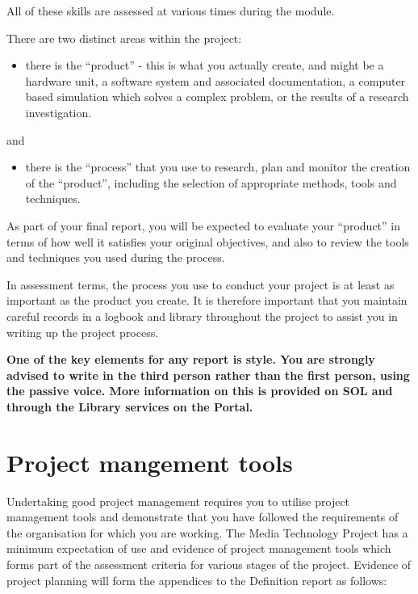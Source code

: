 All of these skills are assessed at various times during the module.

There are two distinct areas within the project:

\begin{itemize}
    \item there is the “product” - this is what you actually create, and might be a hardware unit, a
    software system and associated documentation, a computer based simulation which
    solves a complex problem, or the results of a research investigation.
\end{itemize}

and

\begin{itemize}
    \item there is the “process” that you use to research, plan and monitor the creation of the
    “product”, including the selection of appropriate methods, tools and techniques.
\end{itemize}

As part of your final report, you will be expected to evaluate your “product” in terms of how well it satisfies your original objectives, and also to review the tools and techniques you used during the process.

In assessment terms, the process you use to conduct your project is at least as important as the product you create. It is therefore important that you maintain careful records in a logbook and library throughout the project to assist you in writing up the project process.

\textbf{One of the key elements for any report is style. You are strongly advised to write in the third person rather than the first person, using the passive voice. More information on this is provided on SOL and through the Library services on the Portal.}

\section*{Project mangement tools}

Undertaking good project management requires you to utilise project management tools and
demonstrate that you have followed the requirements of the organisation for which you are
working. The Media Technology Project has a minimum expectation of use and evidence of project
management tools which forms part of the assessment criteria for various stages of the project.
Evidence of project planning will form the appendices to the Definition report as follows:


